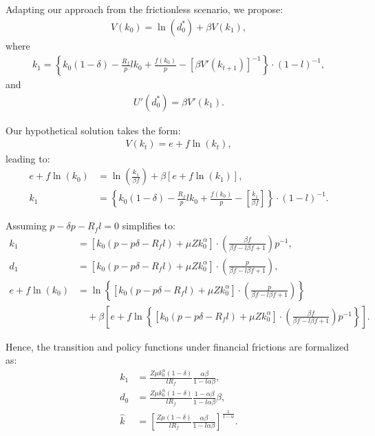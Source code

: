 \documentclass[12pt]{article}
\begin{document}
Adapting our approach from the frictionless scenario, we propose:
\begin{align*}
    V(k_0) = \ln(d_0^*) + \beta V(k_1),
\end{align*}
where
\begin{align*}
    k_1 = \left\{ k_0(1 - \delta) - \frac{R_f}{p} l k_0 + \frac{f(k_0)}{p} - \left[ \beta V'(k_{t+1}) \right]^{-1} \right\} \cdot \left(1-l\right)^{-1},
\end{align*}
and
\begin{align*}
    U'(d_0^*) = \beta V'(k_1).
\end{align*}

Our hypothetical solution takes the form:
\begin{align*}
    V(k_t) = e + f \ln(k_t),
\end{align*}
leading to:
\begin{align}
    e + f \ln(k_0) &= \ln\left( \frac{k_1}{\beta f} \right) + \beta \left[ e + f \ln(k_1) \right], \\
    k_1 &= \left\{ k_0(1 - \delta) - \frac{R_f}{p} l k_0 + \frac{f(k_0)}{p} - \left[ \frac{k_1}{\beta f} \right] \right\} \cdot \left(1-l\right)^{-1}.
\end{align}

Assuming \(p - \delta p - R_f l = 0\) simplifies to:
\begin{align}
    k_1 &= \left[ k_0(p - p\delta - R_f l) + \mu Z k_0^{\alpha} \right] \cdot \left( \frac{\beta f}{\beta f - l\beta f + 1} \right) p^{-1}, \\
    d_1 &= \left[ k_0(p - p\delta - R_f l) + \mu Z k_0^{\alpha} \right] \cdot \left( \frac{p}{\beta f - l\beta f + 1} \right), \\
    e + f \ln(k_0) &= \ln \left\{ \left[ k_0(p - p\delta - R_f l) + \mu Z k_0^{\alpha} \right] \cdot \left( \frac{p}{\beta f - l\beta f + 1} \right) \right\} \nonumber \\
    &\quad + \beta \left[ e + f \ln \left\{ \left[ k_0(p - p\delta - R_f l) + \mu Z k_0^{\alpha} \right] \cdot \left( \frac{\beta f}{\beta f - l\beta f + 1} \right) p^{-1} \right\} \right].
\end{align}

Hence, the transition and policy functions under financial frictions are formalized as:
\begin{align}
    k_1 &= \frac{Z \mu k_0^{\alpha} (1-\delta)}{l R_f} \frac{\alpha\beta}{1-l\alpha\beta}, \\
    d_0 &= \frac{Z \mu k_0^{\alpha} (1-\delta)}{l R_f} \frac{1-\alpha\beta}{1-l\alpha\beta} \beta, \\
    \widehat{k} &= \left[ \frac{Z \mu (1-\delta)}{l R_f} \frac{\alpha\beta}{1-l\alpha\beta} \right]^{\frac{1}{1-\alpha}}.
\end{align}
\end{document}

